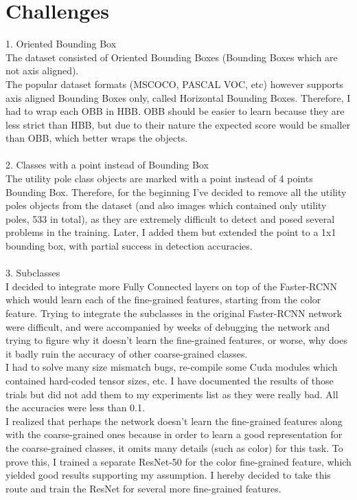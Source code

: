 \documentclass[]{article}
\begin{document}
\section{Challenges}
1. Oriented Bounding Box \\
The dataset consisted of Oriented Bounding Boxes (Bounding Boxes which are not axis aligned). \\
The popular dataset formats (MSCOCO, PASCAL VOC, etc) however supports axis aligned Bounding Boxes only, called Horizontal Bounding Boxes. 
Therefore, I had to wrap each OBB in HBB.  
OBB should be easier to learn because they are less strict than HBB, but due to their nature the expected score would be smaller than OBB, which better wraps the objects.
\\\\
2. Classes with a point instead of Bounding Box\\
The utility pole class objects are marked with a point instead of 4 points Bounding Box. Therefore, for the beginning I've decided to remove all the utility poles objects from the dataset (and also images which contained only utility poles, 533 in total), as they are extremely difficult to detect and posed several problems in the training. Later, I added them but extended the point to a 1x1 bounding box, with partial success in detection accuracies.
\\\\
3. Subclasses\\
I decided to integrate more Fully Connected layers on top of the Faster-RCNN which would learn each of the fine-grained features, starting from the color feature.
Trying to integrate the subclasses in the original Faster-RCNN network were difficult, and were accompanied by weeks of debugging the network and trying to figure why it doesn't learn the fine-grained features, or worse, why does it badly ruin the accuracy of other coarse-grained classes.\\
I had to solve many size mismatch bugs, re-compile some Cuda modules which contained hard-coded tensor sizes, etc.
I have documented the results of those trials but did not add them to my experiments list as they were really bad. All the accuracies were less than 0.1.\\
I realized that perhaps the network doesn't learn the fine-grained features along with the coarse-grained ones because in order to learn a good representation for the coarse-grained classes, it omits many details (such as color) for this task. To prove this, I trained a separate ResNet-50 for the color fine-grained feature, which yielded good results supporting my assumption. I hereby decided to take this route and train the ResNet for several more fine-grained features.
\end{document}

